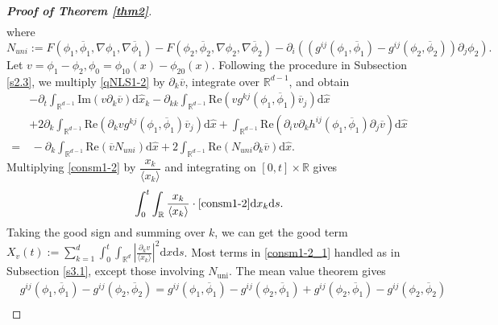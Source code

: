 \documentclass[10pt,twoside,a4paper]{article}
\numberwithin{equation}{section}\allowdisplaybreaks
\begin{document}
\begin{proof}[\textbf{Proof of Theorem \ref{thm2}}]
\begin{align}
 	\end{align}
 	where
 	$$ N_{uni}:= F\left(\phi_1,\overline{\phi}_1,\nabla\phi_1, \nabla \overline{\phi}_1\right)-F\left(\phi_2,\overline{\phi}_2,\nabla\phi_2, \nabla \overline{\phi}_2\right)-\partial_i\left( (g^{ij}\left(\phi_1,\overline{\phi}_1\right)-g^{ij}\left(\phi_2,\overline{\phi}_2\right)) \partial_j\phi_2\right). $$
 	Let $ v=\phi_1-\phi_2, \phi_0=\phi_{10}(x)-\phi_{20}(x) $. Following the procedure in Subsection \ref{s2.3}, we multiply \eqref{qNLS1-2} by $\partial_k \overline{v}$, integrate over $\mathbb{R}^{d-1}$, and obtain
 	\begin{align} \label{consm1-2}
 		&	-\partial_t \int_{\mathbb{R}^{d-1}}  \mathrm{Im}\left(v \partial_k \overline{v} \right) \mathrm{d} \hat{x}_k-\partial_{kk} \int_{\mathbb{R}^{d-1}} \mathrm{Re}\left( v   g^{kj} \left(\phi_1,\overline{\phi}_1\right) \overline{v}_{ j}\right) \mathrm{d} \hat{x}\nonumber\\
 		&+2 \partial_k \int_{\mathbb{R}^{d-1}} \mathrm{Re}\left(\partial_k v  g^{kj} \left(\phi_1,\overline{\phi}_1\right) \overline{v}_{  j}\right) \mathrm{d} \hat{x} + \int_{\mathbb{R}^{d-1}}  \mathrm{Re}\left(\partial_{i} v \partial_k h^{ij} \left(\phi_1,\overline{\phi}_1\right) \partial_j \overline{v} \right)  \mathrm{d} \hat{x} \\
 		=&\,- \partial_k\int_{\mathbb{R}^{d-1}}   \mathrm{Re}\left( \overline{v}  N_{uni} \right)\mathrm{d} \hat{x}+2\int_{\mathbb{R}^{d-1}} \mathrm{Re} \left( N_{uni} \partial_k \overline{ v} \right)   \mathrm{d} \hat{x}. \nonumber
 	\end{align}
 	Multiplying \eqref{consm1-2} by $ \dfrac{x_k}{\langle x_k\rangle} $ and  integrating on $ [0,t]\times\mathbb{R} $ gives
 	\begin{align} \label{consm1-2_1}
 		\int_0^t\int_{ \mathbb{R}}   \frac{x_k}{\langle x_k\rangle}  \cdot\eqref{consm1-2}   \mathrm{d} x_k \mathrm{d} s.
 	\end{align}
 	Taking the good sign and summing over $ k $, we can get the good term
 	$ 	X_v(t):= \sum_{k=1}^d   \int_0^t     \int_{\mathbb{R}^{d}} \left|\frac{\partial_k v  } {\langle x_k\rangle}\right|^2  \mathrm{d} x \mathrm{d} s  $.
 	Most  terms in \eqref{consm1-2_1} handled as in Subsection \ref{s3.1}, except those involving $N_{\text{uni}}$. The mean value theorem gives
 	\begin{align*}
 		&g^{ij}\left(\phi_1,\overline{\phi}_1\right)-g^{ij}\left(\phi_2,\overline{\phi}_2\right)=g^{ij}\left(\phi_1,\overline{\phi}_1\right)-g^{ij}\left(\phi_2,\overline{\phi}_1\right)+g^{ij}\left(\phi_2,\overline{\phi}_1\right)-g^{ij}\left(\phi_2,\overline{\phi}_2\right)\\

\end{align*}
\end{proof}
\end{document}
